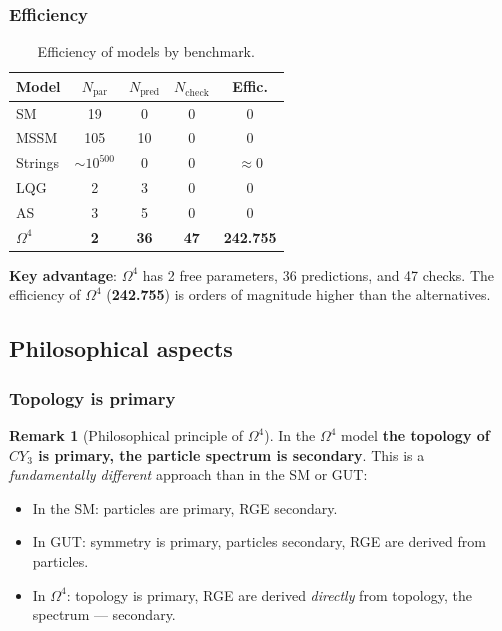 \documentclass[11pt,a4paper]{article}
\newcommand{\CY}{\ensuremath{CY_3}}
\newcommand{\Om}{\ensuremath{\Omega^4}}
\theoremstyle{definition}
\newtheorem{remark}[theorem]{Remark}
\begin{document}
\subsubsection{Efficiency}

\begin{table}[ht]
\centering
\small
\caption{Efficiency of models by benchmark.}
\label{tab:benchmark-disc}
\begin{tabular}{lcccc}
\toprule
Model & $N_{\text{par}}$ & $N_{\text{pred}}$ & $N_{\text{check}}$ & Effic. \\
\midrule
SM     & 19  & 0  & 0  & 0 \\
MSSM   & 105 & 10 & 0  & 0 \\
Strings & $\sim 10^{500}$ & 0 & 0 & $\approx 0$ \\
LQG    & 2   & 3  & 0  & 0 \\
AS     & 3   & 5  & 0  & 0 \\
\textbf{$\Om$} & \textbf{2} & \textbf{36} & \textbf{47} & \textbf{242.755} \\
\bottomrule
\end{tabular}
\end{table}

\medskip\noindent
\textbf{Key advantage}: $\Om$ has 2 free
parameters, 36 predictions, and 47 checks. The efficiency
of $\Om$ (\textbf{242.755}) is orders of magnitude higher than the alternatives.

\subsection{Philosophical aspects}
\label{subsec:disc-philosophy}

\subsubsection{Topology is primary}

\begin{remark}[Philosophical principle of $\Om$]
\label{rem:philosophy-topology}
In the $\Om$ model \textbf{the topology of $\CY$ is primary, the particle spectrum
is secondary}. This is a \emph{fundamentally different} approach than in the SM
or GUT:
\begin{itemize}
    \item In the SM: particles are primary, RGE secondary.
    \item In GUT: symmetry is primary, particles secondary,
          RGE are derived from particles.
    \item In $\Om$: topology is primary, RGE are derived \emph{directly}
          from topology, the spectrum --- secondary.
\end{itemize}
\end{remark}
\end{document}
